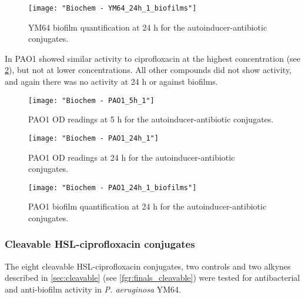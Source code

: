 \begin{figure}[H]
	\begin{center}
		\texttt{[image: "Biochem - YM64\_24h\_1\_biofilms"]}
		\caption{YM64 biofilm quantification at 24 h for the autoinducer-antibiotic conjugates.\label{fgr:YM64_biofilms}}
	\end{center}
\end{figure}


In PAO1  showed similar activity to ciprofloxacin  at the highest concentration (see \ref{fgr:PAO1_5h}), but not at lower concentrations. All other compounds did not show activity, and again there was no activity at 24 h or against biofilms. 

\begin{figure}[H]
	\begin{center}
		\texttt{[image: "Biochem - PAO1\_5h\_1"]}
		\caption{PAO1 OD readings at 5 h for the autoinducer-antibiotic conjugates.\label{fgr:PAO1_5h}}
	\end{center}
\end{figure}

\begin{figure}[H]
	\begin{center}
		\texttt{[image: "Biochem - PAO1\_24h\_1"]}
		\caption{PAO1 OD readings at 24 h for the autoinducer-antibiotic conjugates.\label{fgr:PAO1_24h}}
	\end{center}
\end{figure}

\begin{figure}[H]
	\begin{center}
		\texttt{[image: "Biochem - PAO1\_24h\_1\_biofilms"]}
		\caption{PAO1 biofilm quantification at 24 h for the autoinducer-antibiotic conjugates.\label{fgr:PAO1_biofilms}}
	\end{center}
\end{figure}

\subsubsection{Cleavable HSL-ciprofloxacin conjugates}

The eight cleavable HSL-ciprofloxacin conjugates, two controls and two alkynes described in \ref{sec:cleavable} (see \ref{fgr:finals_cleavable}) were tested for antibacterial and anti-biofilm activity in \textit{P. aeruginosa} YM64. 

